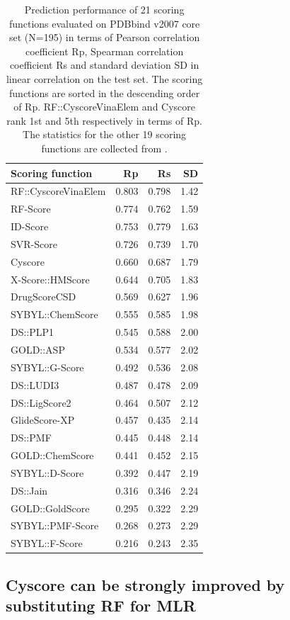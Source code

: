 \documentclass[journal=jacsat,manuscript=article]{achemso}
\begin{document}
\begin{table}[ht]
\caption{Prediction performance of 21 scoring functions evaluated on PDBbind v2007 core set (N=195) in terms of Pearson correlation coefficient Rp, Spearman correlation coefficient Rs and standard deviation SD in linear correlation on the test set. The scoring functions are sorted in the descending order of Rp. RF::CyscoreVinaElem and Cyscore rank 1st and 5th respectively in terms of Rp. The statistics for the other 19 scoring functions are collected from \cite{1362}.}
\label{tbl:trn1105tst195}
\begin{tabular}{lrrr}
\hline
Scoring function & Rp & Rs & SD\\
\hline
RF::CyscoreVinaElem & 0.803 & 0.798 & 1.42\\
RF-Score & 0.774 & 0.762 & 1.59\\
ID-Score & 0.753 & 0.779 & 1.63\\
SVR-Score & 0.726 & 0.739 & 1.70\\
Cyscore & 0.660 & 0.687 & 1.79\\
X-Score::HMScore & 0.644 & 0.705 & 1.83\\
DrugScoreCSD & 0.569 & 0.627 & 1.96\\
SYBYL::ChemScore & 0.555 & 0.585 & 1.98\\
DS::PLP1 & 0.545 & 0.588 & 2.00\\
GOLD::ASP & 0.534 & 0.577 & 2.02\\
SYBYL::G-Score & 0.492 & 0.536 & 2.08\\
DS::LUDI3 & 0.487 & 0.478 & 2.09\\
DS::LigScore2 & 0.464 & 0.507 & 2.12\\
GlideScore-XP & 0.457 & 0.435 & 2.14\\
DS::PMF & 0.445 & 0.448 & 2.14\\
GOLD::ChemScore & 0.441 & 0.452 & 2.15\\
SYBYL::D-Score & 0.392 & 0.447 & 2.19\\
DS::Jain & 0.316 & 0.346 & 2.24\\
GOLD::GoldScore & 0.295 & 0.322 & 2.29\\
SYBYL::PMF-Score & 0.268 & 0.273 & 2.29\\
SYBYL::F-Score & 0.216 & 0.243 & 2.35\\
\hline
\end{tabular}
\end{table}

\subsection{Cyscore can be strongly improved by substituting RF for MLR}
\end{document}
